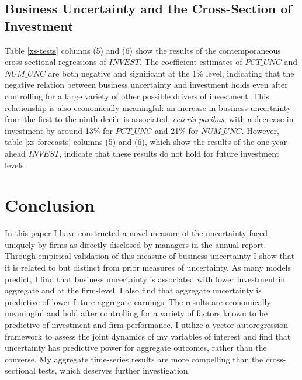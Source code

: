\documentclass[12pt, letterpaper]{article}
\begin{document}
\subsection{Business Uncertainty and the Cross-Section of Investment}
Table \ref{xs-tests} columns (5) and (6) show the results of the contemporaneous cross-sectional regressions of $INVEST$. The coefficient estimates of $PCT\_UNC$ and $NUM\_UNC$ are both negative and significant at the 1\% level, indicating that the negative relation between business uncertainty and investment holds even after controlling for a large variety of other possible drivers of investment. This relationship is also economically meaningful: an increase in business uncertainty from the first to the ninth decile is associated, \emph{ceteris paribus}, with a decrease in investment by around 13\% for $PCT\_UNC$ and 21\% for $NUM\_UNC$. However, table \ref{xs-forecasts} columns (5) and (6), which show the results of the one-year-ahead $INVEST$, indicate that these results do not hold for future investment levels.

\section{Conclusion}\label{conclusion} 
In this paper I have constructed a novel measure of the uncertainty faced uniquely by firms as directly disclosed by managers in the annual report. Through empirical validation of this measure of business uncertainty I show that it is related to but distinct from prior measures of uncertainty. As many models predict, I find that business uncertainty is associated with lower investment in aggregate and at the firm-level. I also find that aggregate uncertainty is predictive of lower future aggregate earnings. The results are economically meaningful and hold after controlling for a variety of factors known to be predictive of investment and firm performance. I utilize a vector autoregression framework to assess the joint dynamics of my variables of interest and find that uncertainty has predictive power for aggregate outcomes, rather than the converse. My aggregate time-series results are more compelling than the cross-sectional tests, which deserves further investigation.

\newpage 

 
\newpage 

\end{document}

